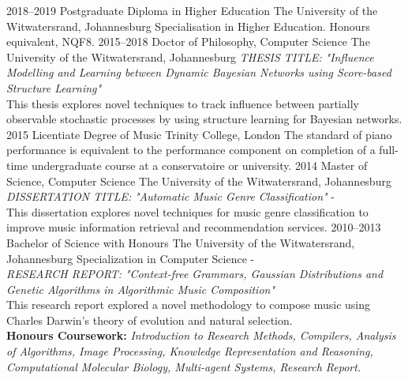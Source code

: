\documentclass[]{friggeri-cv} %
\begin{document}
\begin{entrylist}
\entry
{2018--2019}
{Postgraduate Diploma {\normalfont in Higher Education}}
{The University of the Witwatersrand, Johannesburg}
{Specialisation in Higher Education. Honours equivalent, NQF8.}
\entry
{2015--2018}
{Doctor {\normalfont of Philosophy, Computer Science}}
{The University of the Witwatersrand, Johannesburg}
{\emph{THESIS TITLE:} {\it "Influence Modelling and Learning between Dynamic Bayesian Networks using Score-based Structure Learning"} \\ This thesis explores novel techniques to track influence between partially observable stochastic processes by using structure learning for Bayesian networks.}
\entry
{2015}
{Licentiate {\normalfont Degree of Music}}
{Trinity College, London}
{The standard of piano performance is equivalent to the performance component on completion of a full-time undergraduate course at a conservatoire or university.}
\entry
{2014}
{Master {\normalfont of Science, Computer Science}}
{The University of the Witwatersrand, Johannesburg}
{\emph{DISSERTATION TITLE:} {\it "Automatic Music Genre Classification"} - {\bf \color{bloodred}{with distinction}}\\ This dissertation explores novel techniques for music genre classification to improve music information retrieval and recommendation services.}
\entry
{2010--2013}
{Bachelor {\normalfont of Science} with Honours}
{The University of the Witwatersrand, Johannesburg}
{Specialization in Computer Science - {\bf \color{bloodred}{with distinction}} \\ \emph{RESEARCH REPORT:} {\it "Context-free Grammars, Gaussian Distributions and Genetic Algorithms in Algorithmic Music Composition"} \\ This research report explored a novel methodology to compose music using Charles Darwin's theory of evolution and natural selection.\\
{\bf Honours Coursework: } \emph{Introduction to Research Methods, Compilers, Analysis of Algorithms, Image Processing, Knowledge Representation and Reasoning, Computational Molecular Biology, Multi-agent Systems, Research Report.}\\
}
\end{entrylist}
\end{document}
